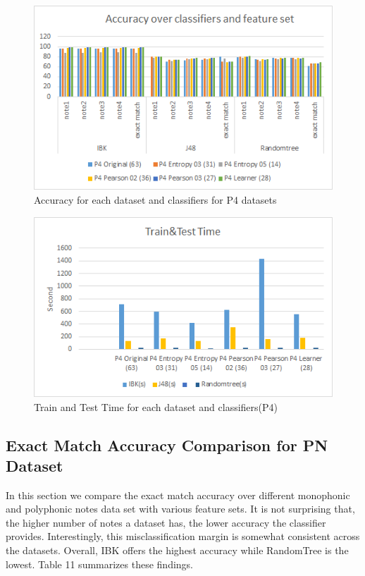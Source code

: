 \documentclass{article}
\begin{document}
\begin{figure}[h]
\includegraphics[scale=.50]{accuracy_p4}
 \caption{Accuracy for each dataset and classifiers for P4 datasets}
\label{figure2}
\end{figure}
\begin{figure}[h]
\includegraphics[scale=.50]{time_p4}
 \caption{Train and Test Time for each dataset and classifiers(P4)}
\label{figure2}
\end{figure}

\subsection{Exact Match Accuracy Comparison for PN Dataset}

In this section we compare the exact match accuracy over different monophonic and polyphonic notes data set with various feature sets. It is not surprising that, the higher number of notes a dataset has, the lower accuracy the classifier provides. Interestingly, this misclassification margin is somewhat consistent across the datasets. Overall, IBK offers the highest accuracy while RandomTree is the lowest. Table 11 summarizes these findings.
\end{document}
